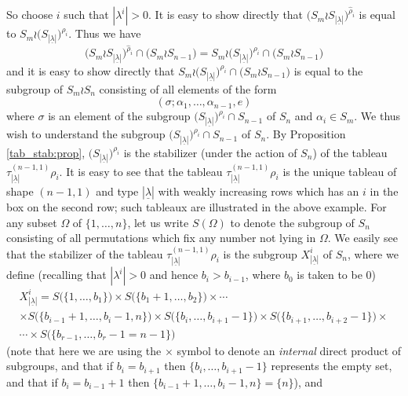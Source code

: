 \documentclass[ALCO,Unicode,published]{cedram}
\newcommand{\ul}[1]{\underline{#1}}
\begin{document}
So choose $i$ such that $|\lambda^i|>0$.
It is easy to show directly that $\bigl(S_m \wr S_{|\ul{\lambda}|}\bigr)^{\hat\rho_i}$ is equal to
$S_m \wr \bigl(S_{|\ul{\lambda}|}\bigr)^{\rho_i}$. Thus we have
\[\bigl(S_m \wr S_{|\ul{\lambda}|}\bigr)^{\hat\rho_i}\cap\bigl(S_m \wr S_{n-1}\bigr)
=
S_m \wr \bigl(S_{|\ul{\lambda}|}\bigr)^{\rho_i}\cap\bigl(S_m \wr S_{n-1}\bigr)\]
and it is easy to show directly that $S_m \wr \bigl(S_{|\ul{\lambda}|}\bigr)^{\rho_i}\cap\bigl(S_m \wr S_{n-1}\bigr)$
is equal to the subgroup of $S_m \wr S_n$ consisting of all elements of the form
\begin{equation}\label{elt_of_conj_intersect:eq}
(\sigma; \alpha_1,\ldots,\alpha_{n-1},e)
\end{equation}
where $\sigma$ is an element of the subgroup
$\bigl(S_{|\ul{\lambda}|}\bigr)^{\rho_i}\cap S_{n-1}$ of $S_n$
and $\alpha_i \in S_m$. We thus wish to understand the subgroup $\bigl(S_{|\ul{\lambda}|}\bigr)^{\rho_i}\cap S_{n-1}$ of $S_n$.
By Proposition \ref{tab_stab:prop}, $\bigl(S_{|\ul{\lambda}|}\bigr)^{\rho_i}$ is the stabilizer (under
the action of $S_n$) of the tableau $\tau^{(n-1,1)}_{|\ul{\lambda}|}\rho_i$. It is easy to see that the tableau
$\tau^{(n-1,1)}_{|\ul{\lambda}|}\rho_i$ is the unique tableau of shape $(n-1,1)$ and type $|\ul{\lambda}|$ with weakly increasing rows which
has an $i$ in the box on the second row; such tableaux are illustrated in the above example. For any subset $\Omega$ of $\{1,\ldots,n\}$,
let us write $S(\Omega)$ to denote the subgroup of
$S_n$ consisting of all permutations which fix any number not lying in $\Omega$. We easily see that the stabilizer of the tableau
$\tau^{(n-1,1)}_{|\ul{\lambda}|}\rho_i$ is the subgroup $X^i_{|\ul{\lambda}|}$ of $S_n$, where we define (recalling that $|\lambda^i|>0$ and hence
$b_i > b_{i-1}$, where $b_0$ is taken to be 0)
\begin{multline*}
X^i_{|\ul{\lambda}|} = S\bigl(\{1,\ldots,b_1\}\bigr) \times S\bigl(\{b_1+1,\ldots,b_2\}\bigr) \times \cdots\\
\times S\bigl(\{b_{i-1}+1,\ldots,b_i-1,n\}\bigr)\times
S\bigl(\{b_i,\ldots,b_{i+1}-1\}\bigr)\times S\bigl(\{b_{i+1},\ldots,b_{i+2}-1\}\bigr)\times\\
\cdots \times S\bigl(\{b_{r-1},\ldots,b_r-1 =n-1\}\bigr)
\end{multline*}
(note that here we are using the $\times$ symbol to denote an \textit{internal} direct product of subgroups, and that if $b_i = b_{i+1}$
then $\{b_i,\ldots,b_{i+1}-1\}$ represents the empty set, and that if $b_i = b_{i-1}+1$ then $\{b_{i-1}+1,\ldots,b_i-1,n\} = \{n\}$), and
\end{document}
